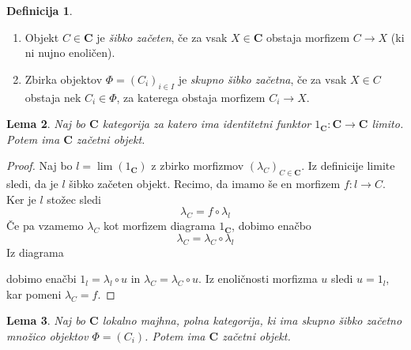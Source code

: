\documentclass[12pt,a4paper]{book}
\theoremstyle{definition}
\newtheorem{definicija}{Definicija}[chapter]
\theoremstyle{plain}
\newtheorem{lema}[definicija]{Lema}
\theoremstyle{definition}
\theoremstyle{remark}
\newcommand{\cat}[1]{\textbf{#1}}
\begin{document}
\begin{definicija}
\mbox{}
\begin{enumerate}[label=(\roman*)]
\item Objekt $C \in \cat{C}$ je \emph{šibko začeten}, če za vsak $X \in \cat{C}$ obstaja morfizem $C \to X$ (ki ni nujno enoličen).
\item Zbirka objektov $\Phi = (C_i)_{i \in I}$ je \emph{skupno šibko začetna}, če za vsak $X \in C$ obstaja nek $C_i \in \Phi$, za katerega obstaja morfizem $C_i \to X$.
\end{enumerate}
\end{definicija}
\begin{lema}
Naj bo $\cat{C}$ kategorija za katero ima identitetni funktor $1_\cat{C} : \cat{C} \to \cat{C}$ limito. Potem ima $\cat{C}$ začetni objekt.
\end{lema}
\begin{proof}
Naj bo $l = \lim (1_\cat{C})$ z zbirko morfizmov $(\lambda_C)_{C \in \cat{C}}$. Iz definicije limite sledi, da je $l$ šibko začeten objekt. Recimo, da imamo še en morfizem $f : l \to C$. Ker je $l$ stožec sledi
$$ \lambda_C  = f \circ \lambda_l$$
Če pa vzamemo $\lambda_C$ kot morfizem diagrama $1_\cat{C}$, dobimo enačbo
$$\lambda_C = \lambda_C \circ \lambda_l$$
Iz diagrama
\begin{center}
\end{center}
dobimo enačbi $1_l = \lambda_l \circ u$ in $\lambda_C = \lambda_C \circ u$. Iz enoličnosti morfizma $u$ sledi $u = 1_l$, kar pomeni $\lambda_C = f$.
\end{proof}
\begin{lema} \label{lema1}
Naj bo $\cat{C}$ lokalno majhna, polna kategorija, ki ima skupno šibko začetno množico objektov $\Phi = (C_i)$. Potem ima $\cat{C}$ začetni objekt.
\end{lema}
\end{document}
